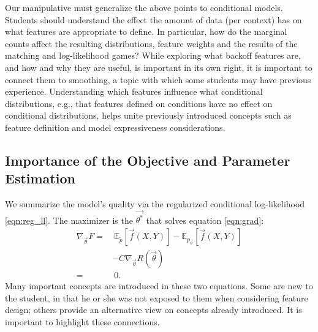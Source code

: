 \documentclass[11pt,letterpaper]{article}
\newcommand{\empirical}[0]{\ensuremath{\tilde{p}}}
\newcommand{\Data}[0]{\ensuremath{\mathcal{D}}}
\begin{document}
Our manipulative must generalize the above points to conditional models. Students should 
understand the effect the amount of data (per context) has on what features are appropriate to define. 
In particular, how do the marginal counts affect the resulting distributions, feature 
weights and the results of the matching and log-likelihood games? 
While exploring what backoff features are, and how and why they are useful, is important in its own right, 
it is important to connect them to smoothing, a topic with which some students may have previous experience. 
Understanding which features influence 
what conditional distributions, e.g., that features defined on conditions have no effect on conditional distributions, 
helps unite previously introduced concepts such as feature definition and model expressiveness considerations.



\subsection{Importance of the Objective and Parameter Estimation} %

We summarize the model's quality via the regularized conditional
log-likelihood \eqref{eqn:reg_ll}.  
The maximizer is the $\vec{\theta^*}$ that solves equation \eqref{eqn:grad}:
\begin{equation}
\begin{aligned}
\nabla_{\vec{\theta}} F
 = &
\ \mathbb{E}_{\empirical{}}\left[\vec{f}(X,Y)\right] 
- \mathbb{E}_{{p_{\vec{\theta}}}}\left[\vec{f}(X,Y)\right]\\
 & - C \nabla_{\vec{\theta}}R(\vec{\theta})
\label{eqn:grad} \\
 = &\ 0.
\end{aligned}
\end{equation}
Many important concepts are introduced in these two equations. Some are new to the student, in that he or
she was not exposed to them when considering feature design; others provide an alternative view
on concepts already introduced. It is important to highlight these connections.
\end{document}

